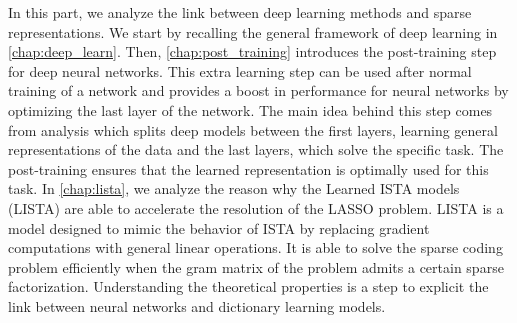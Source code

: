 \documentclass[../thesis.tex]{subfiles}
\begin{document}
	In this part, we analyze the link between deep learning methods and sparse
	representations. We start by recalling the general framework of deep learning in
	\autoref{chap:deep_learn}. Then, \autoref{chap:post_training} introduces the post-training
	step for deep neural networks. This extra learning step can be used after normal
	training of a network and provides a boost in performance for neural networks by
	optimizing the last layer of the network. The main idea behind this step comes from
	analysis which splits deep models between the first layers, learning general representations
	of the data and the last layers, which solve the specific task. The post-training ensures
	that the learned representation is optimally used for this task. In \autoref{chap:lista},
	we analyze the reason why the Learned ISTA models (LISTA) are able to accelerate the
	resolution of the LASSO problem. LISTA is a model designed to mimic the behavior of ISTA
	by replacing gradient computations with general linear operations. It is able to solve the
	sparse coding problem efficiently when the gram matrix of the problem admits a certain
	sparse factorization. Understanding the theoretical properties is a step to explicit
	the link between neural networks and dictionary learning models.



\biblio{}
\end{document}
